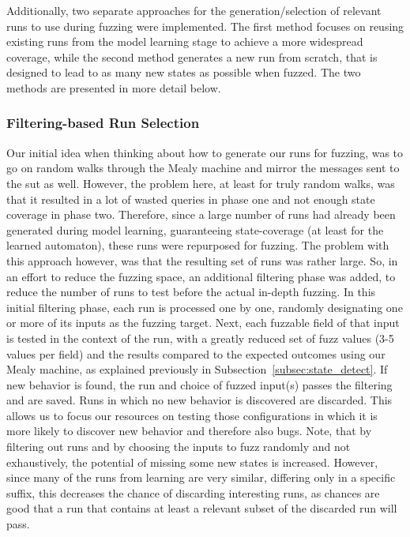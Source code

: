 Additionally, two separate approaches for the generation/selection of relevant runs to use during fuzzing were implemented. The first method focuses on reusing existing runs from the model learning stage to achieve a more widespread coverage, while the second method generates a new run from scratch, that is designed to lead to as many new states as possible when fuzzed. The two methods are presented in more detail below.

\subsubsection{Filtering-based Run Selection} \label{subsubsec:fuzz_filtering}
Our initial idea when thinking about how to generate our runs for fuzzing, was to go on random walks through the Mealy machine and mirror the messages sent to the \ac{sut} as well. However, the problem here, at least for truly random walks, was that it resulted in a lot of wasted queries in phase one and not enough state coverage in phase two. Therefore, since a large number of runs had already been generated during model learning, guaranteeing state-coverage (at least for the learned automaton), these runs were repurposed for fuzzing. The problem with this approach however, was that the resulting set of runs was rather large. So, in an effort to reduce the fuzzing space, an additional filtering phase was added, to reduce the number of runs to test before the actual in-depth fuzzing. In this initial filtering phase, each run is processed one by one, randomly designating one or more of its inputs as the fuzzing target. Next, each fuzzable field of that input is tested in the context of the run, with a greatly reduced set of fuzz values (3-5 values per field) and the results compared to the expected outcomes using our Mealy machine, as explained previously in Subsection~\ref{subsec:state_detect}. If new behavior is found, the run and choice of fuzzed input(s) passes the filtering and are saved. Runs in which no new behavior is discovered are discarded. This allows us to focus our resources on testing those configurations in which it is more likely to discover new behavior and therefore also bugs.
Note, that by filtering out runs and by choosing the inputs to fuzz randomly and not exhaustively, the potential of missing some new states is increased. However, since many of the runs from learning are very similar, differing only in a specific suffix, this decreases the chance of discarding interesting runs, as chances are good that a run that contains at least a relevant subset of the discarded run will pass.

